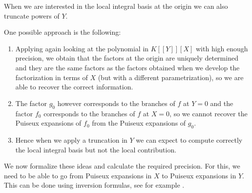 \documentclass[a4paper,11pt,reqno]{amsart}%
\theoremstyle{definition}
\theoremstyle{plain}
\theoremstyle{remark}
\begin{document}
When we are interested in the local integral basis at the origin we can also truncate powers of $Y$.

One possible approach is the following:
\begin{enumerate}
\item Applying again \cite[Proposition 23]{poteaux2021} looking at the polynomial in  $K[[Y]][X]$ with high enough precision, we obtain that the factors at the origin are uniquely determined and they are the same factors as the factors obtained when we develop the factorization in terms of $X$ (but with a different parametrization), so we are able to recover the correct information.
\item The factor $g_0$ however corresponds to the branches of $f$ at $Y = 0$ and the factor $f_0$ corresponds to the branches of $f$ at $X = 0$, so we cannot recover the Puiseux expansions of $f_0$ from the Puiseux expansions of $g_0$.
\item Hence when we apply a truncation in $Y$ we can expect to compute correctly the local integral basis but not the local contribution.
\end{enumerate}

We now formalize these ideas and calculate the required precision. For this, we need to be able to go from Puiseux expansions in $X$ to Puiseux expansions in $Y$.  This can be done using inversion formulas, see for example \cite{Barroso}.

\end{document}

